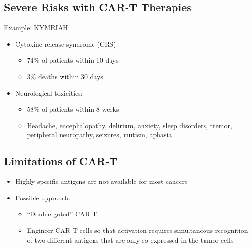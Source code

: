 \documentclass[10pt]{article}
\begin{document}
\subsection*{Severe Risks with CAR-T Therapies}
Example: KYMRIAH
\begin{itemize}
	\item Cytokine release syndrome (CRS)
	\begin{itemize}
        \item 74\% of patients within 10 days
        \item 3\% deaths within 30 days
    \end{itemize}
	\item Neurological toxicities: 
    \begin{itemize}
        \item 58\% of patients within 8 weeks
        \item Headache, encephalopathy, delirium, anxiety, sleep disorders, tremor, peripheral neuropathy, seizures, mutism, aphasia
    \end{itemize}
\end{itemize}

\subsection*{Limitations of CAR-T}
\begin{itemize}
	\item Highly specific antigens are not available for most cancers
	\item Possible approach:
	\begin{itemize}
        \item ``Double-gated'' CAR-T
        \item Engineer CAR-T cells so that activation requires simultaneous recognition of two different antigens that are only co-expressed in the tumor cells
    \end{itemize}
\end{itemize}
\end{document}
